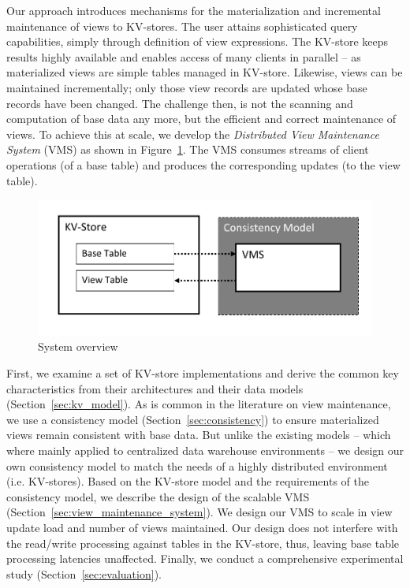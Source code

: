 Our approach introduces mechanisms for the materialization and 
incremental maintenance of views to KV-stores. The user 
attains sophisticated query capabilities, simply through definition of 
view expressions. The KV-store keeps results highly available and
enables access of many clients in parallel -- as materialized views 
are simple tables managed in KV-store. Likewise, views can be maintained 
incrementally; only those view records are updated whose 
base records have been changed. The challenge then, is not the scanning
 and computation of base data any more, but the efficient and correct 
maintenance of views. To achieve this at scale, we develop the 
\textit{Distributed View Maintenance System} (VMS) as shown in 
Figure~\ref{fig:research_goal}. The VMS consumes streams of client 
operations (of a base table) and produces the corresponding updates 
(to the view table). 

\begin{figure} 
	\centering 
	\includegraphics[width=\linewidth]{figures/ResearchGoal} 
	\vspace{-10mm} 
	\caption{System overview} 
	\vspace{-5mm} \label{fig:research_goal} 
\end{figure} 

First, we examine a set of KV-store 
implementations\cite{george:hbase, 
hewitt:cassandra, chang:bigtable, cooper:pnuts} and derive the common 
key characteristics from their architectures and their data models 
(Section~\ref{sec:kv_model}). As is common in the literature on view 
maintenance, we use a consistency model 
(Section~\ref{sec:consistency}) to ensure materialized views remain 
consistent with base data. But unlike the existing 
models\cite{zhuge:view, wang:efficient, zhang:parallel} -- which where 
mainly applied to centralized data warehouse environments -- we design 
our own consistency model to match the needs of a highly distributed 
environment (i.e. KV-stores). Based on the KV-store model and the requirements
of the consistency model, we describe 
the design of the scalable VMS (Section~\ref{sec:view_maintenance_system}). 
We design our VMS to scale in view update load and number of views 
maintained. Our design does not interfere with the read/write processing 
against tables in the KV-store, thus, leaving base table processing 
latencies unaffected. Finally, we conduct a comprehensive 
experimental study (Section~\ref{sec:evaluation}).

